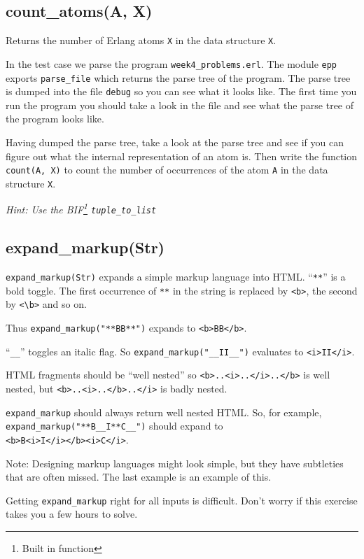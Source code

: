 \documentclass[12pt]{hitec}
\begin{document}
\subsection{count\_atoms(A, X)}

Returns the number of Erlang atoms \verb+X+ in the data structure \verb+X+.

In the test case we parse the program \verb+week4_problems.erl+.  The
module \verb+epp+ exports \verb+parse_file+ which returns the parse
tree of the program. The parse tree is dumped into the file
\verb+debug+ so you can see what it looks like. The first time you run
the program you should take a look in the file and see what the parse
tree of the program looks like.

Having dumped the parse tree, take a look at the parse tree and see if
you can figure out what the internal representation of an atom
is. Then write the function \verb+count(A, X)+ to count the number of
occurrences of the atom \verb+A+ in the data structure \verb+X+.

{\sl Hint: Use the BIF\footnote{Built in function} \verb+tuple_to_list+}

\subsection{expand\_markup(Str)}

\verb+expand_markup(Str)+ expands a simple markup language into HTML.
``\verb+**+'' is a bold toggle. The first occurrence of \verb+**+ in the string
is replaced by \verb+<b>+, the second by \verb+<\b>+ and so on.

Thus \verb+expand_markup("**BB**")+ expands to \verb+<b>BB</b>+.

``\verb+__+'' toggles an italic flag. So \verb+expand_markup("__II__")+ evaluates to
\verb+<i>II</i>+.

HTML fragments should be ``well nested'' so
\verb+<b>..<i>..</i>..</b>+ is well nested, but \verb+<b>..<i>..</b>..</i>+ is
badly nested.

\verb+expand_markup+ should always return well nested HTML. 
So, for example, \verb+expand_markup("**B__I**C__")+ should expand
to\\
\verb+<b>B<i>I</i></b><i>C</i>+.

Note: Designing markup languages might look simple, but they have
subtleties that are often missed. The last example is an example of
this.

Getting \verb+expand_markup+ right for all inputs is difficult.  Don't
worry if this exercise takes you a few hours to solve.
\end{document}
